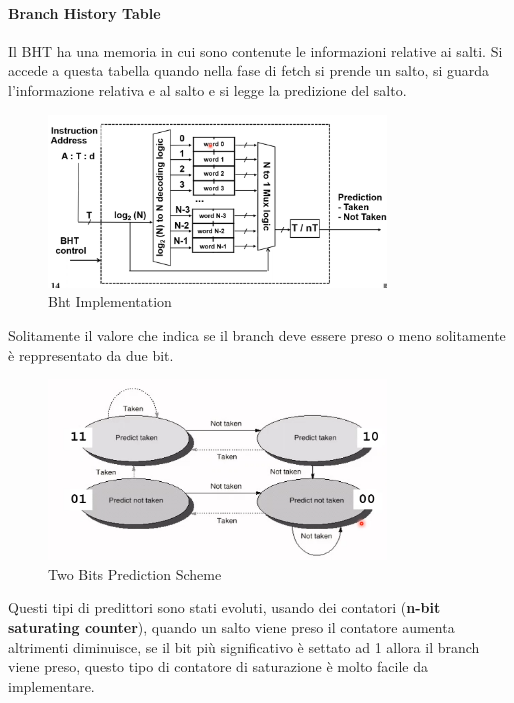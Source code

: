 \documentclass[12pt]{article}
\begin{document}
\paragraph{Branch History Table}
Il BHT ha una memoria in cui sono contenute le informazioni relative ai salti. Si accede a questa tabella quando nella fase di fetch si prende un salto, si guarda l'informazione relativa e al salto e si legge la predizione del salto.
\begin{figure}[H]
    \centering
    \includegraphics[width=0.8\textwidth]{bht-implementation.png}
    \caption{Bht Implementation}
    \label{fig:bht-implementation}
\end{figure}
Solitamente il valore che indica se il branch deve essere preso o meno solitamente \`e reppresentato da due bit.
\begin{figure}[H]
    \centering
    \includegraphics[width=0.8\textwidth]{two-bits-prediction-scheme.png}
    \caption{Two Bits Prediction Scheme}
    \label{fig:two-bits-prediction-scheme}
\end{figure}
Questi tipi di predittori sono stati evoluti, usando dei contatori (\textbf{n-bit saturating counter}), quando un salto viene preso il contatore aumenta altrimenti diminuisce, se il bit pi\`u significativo \`e settato ad 1 allora il branch viene preso, questo tipo di contatore di saturazione \`e molto facile da implementare.
\end{document}
